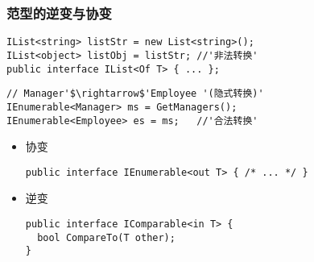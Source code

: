 \begin{frame}[fragile]
\frametitle{范型的逆变与协变}
\begin{lstlisting}[escapeinside='']
IList<string> listStr = new List<string>();
IList<object> listObj = listStr; //'非法转换'
public interface IList<Of T> { ... };
\end{lstlisting}

\begin{lstlisting}[escapeinside='']
// Manager'$\rightarrow$'Employee '(隐式转换)'
IEnumerable<Manager> ms = GetManagers();
IEnumerable<Employee> es = ms;   //'合法转换'
\end{lstlisting}
\begin{itemize}
\item 协变
\begin{lstlisting}
public interface IEnumerable<out T> { /* ... */ }
\end{lstlisting}
\item 逆变
\begin{lstlisting}
public interface IComparable<in T> { 
  bool CompareTo(T other); 
}
\end{lstlisting}
\end{itemize}
\end{frame}


